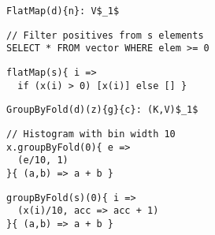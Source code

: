 \begin{figure*}
\newsavebox{\FlatMap}
\begin{lrbox}{\FlatMap}
\begin{lstlisting}[language=PPLTable]
FlatMap(d){n}: V$_1$
\end{lstlisting}
\end{lrbox}

\newsavebox{\FlatMapHLL}
\begin{lrbox}{\FlatMapHLL}
\begin{lstlisting}[language=PPLTable]
// Filter positives from s elements
SELECT * FROM vector WHERE elem >= 0
\end{lstlisting}
\end{lrbox}

\newsavebox{\FlatMapPPL}
\begin{lrbox}{\FlatMapPPL}
\begin{lstlisting}[language=PPLTable]
flatMap(s){ i =>
  if (x(i) > 0) [x(i)] else [] }
\end{lstlisting}
\end{lrbox}

\newsavebox{\GroupByFold}
\begin{lrbox}{\GroupByFold}
\begin{lstlisting}[language=PPLTable]
GroupByFold(d)(z){g}{c}: (K,V)$_1$
\end{lstlisting}
\end{lrbox}

\newsavebox{\GroupByFoldHLL}
\begin{lrbox}{\GroupByFoldHLL}
\begin{lstlisting}[language=PPLTable]
// Histogram with bin width 10
x.groupByFold(0){ e =>
  (e/10, 1)
}{ (a,b) => a + b }
\end{lstlisting}
\end{lrbox}

\newsavebox{\GroupByFoldPPL}
\begin{lrbox}{\GroupByFoldPPL}
\begin{lstlisting}[language=PPLTable]
groupByFold(s)(0){ i =>
  (x(i)/10, acc => acc + 1)
}{ (a,b) => a + b }
\end{lstlisting}
\end{lrbox}


\end{figure*}
